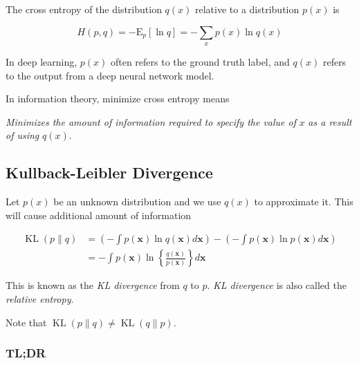 \documentclass{article}
\begin{document}
            The cross entropy of the distribution $ q(x) $ relative to a
            distribution $ p(x) $ is

            \begin{equation*}
                H(p,q) = -\mathrm{E}_p[\ln q] = - \sum_x p(x) \ln q(x) 
            \end{equation*}

            In deep learning, $ p(x) $ often refers to the ground truth label,
            and $ q(x) $ refers to the output from a deep neural network model.

            In information theory, minimize cross entropy means

            \begin{displayquote}
                 \textit{Minimizes the amount of information required to
                 specify the value of} $ x $ \textit{as a result of using} $
                 q(x) $.
            \end{displayquote}
        
        \subsection{Kullback-Leibler Divergence}

            Let $ p(x) $ be an unknown distribution and we use $ q(x) $ to
            approximate it. This will cause additional amount of information

            \begin{align*}
                \operatorname{KL}(p \| q) &= \left(
                        -\int p(\mathbf{x}) \ln
                        q(\mathbf{x}) d \mathbf{x}
                    \right) - \left(
                        -\int p(\mathbf{x}) \ln
                        p(\mathbf{x}) d \mathbf{x}
                    \right) \\
                                 &= -\int p(\mathbf{x}) \ln
                    \left\{
                        \frac{ q(\mathbf{x}) }{ p(\mathbf{x}) }
                    \right\} d \mathbf{x}
            \end{align*}

            This is known as the \textit{KL divergence} from $ q $ to $ p $.
            \textit{KL divergence} is also called the \textit{relative entropy}.

            Note that $ \operatorname{KL}(p \| q) \neq \operatorname{KL}(q \| p) $.

            \subsubsection*{TL;DR}
\end{document}
